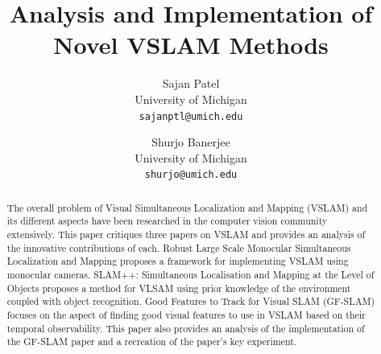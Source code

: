 \documentclass[10pt,twocolumn,letterpaper]{article}
\begin{document}
\title{Analysis and Implementation of Novel VSLAM Methods}

\author{Sajan Patel\\
University of Michigan\\
{\tt\small sajanptl@umich.edu}
\and
Shurjo Banerjee\\
University of Michigan\\
{\tt\small shurjo@umich.edu}
}

\maketitle

\begin{abstract}
The overall problem of Visual Simultaneous Localization and Mapping (VSLAM) and its different aspects have 
been researched in the computer vision community extensively. This paper critiques three papers on VSLAM 
and provides an analysis of the innovative contributions of each. Robust Large Scale Monocular Simultaneous Localization and Mapping proposes a framework for implementing VSLAM using monocular cameras. SLAM++: Simultaneous Localisation and Mapping at the Level of Objects proposes a method for VLSAM using prior knowledge of the environment coupled with object recognition. Good Features to Track for Visual SLAM (GF-SLAM) focuses on the aspect of finding good visual features to use in VSLAM based on their temporal observability. This paper also provides an analysis of the implementation of the GF-SLAM paper and a recreation of the paper's key experiment.
\end{abstract}

\end{document}
